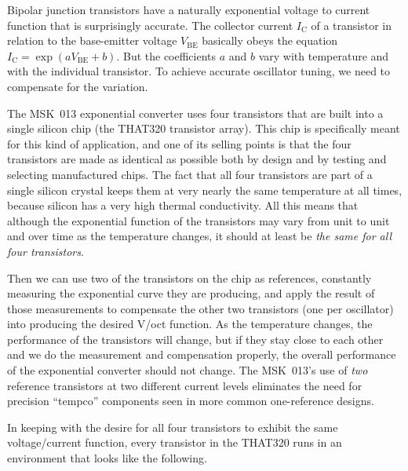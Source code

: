 Bipolar junction transistors have a naturally exponential voltage to current
function that is surprisingly accurate.  The collector current
$I_\textrm{C}$ of a transistor in relation to the base-emitter voltage
$V_\textrm{BE}$ basically obeys the equation $I_\textrm{C} = \exp
(aV_\textrm{BE}+b)$.  But the coefficients $a$ and $b$ vary with temperature
and with the individual transistor.  To achieve accurate oscillator tuning,
we need to compensate for the variation.

The MSK~013 exponential converter uses four transistors that are built into
a single silicon chip (the THAT320 transistor array).  This chip is
specifically meant for this kind of application, and one of its selling
points is that the four transistors are made as identical as possible both
by design and by testing and selecting manufactured chips.  The fact that
all four transistors are part of a single silicon crystal keeps them at very
nearly the same temperature at all times, because silicon has a very high
thermal conductivity.  All this means that although the exponential function
of the transistors may vary from unit to unit and over time as the
temperature changes, it should at least be \emph{the same for all four
transistors}.

Then we can use two of the transistors on the chip as references, constantly
measuring the exponential curve they are producing, and apply the result of
those measurements to compensate the other two transistors (one per
oscillator) into producing the desired V/oct function.  As the temperature
changes, the performance of the transistors will change, but if they stay
close to each other and we do the measurement and compensation properly, the
overall performance of the exponential converter should not change.  The
MSK~013's use of \emph{two} reference transistors at two different current
levels eliminates the need for precision ``tempco'' components seen in more
common one-reference designs.

In keeping with the desire for all four transistors to exhibit the same
voltage/current function, every transistor in the THAT320 runs in an
environment that looks like the following.

{\centering\par}

